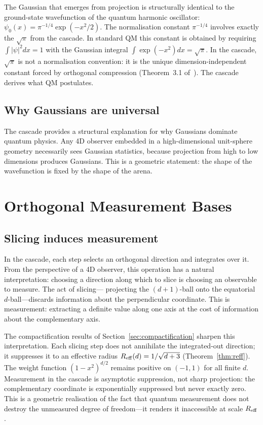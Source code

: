 \documentclass[12pt,a4paper]{article}
\begin{document}
The Gaussian that emerges from projection is structurally identical to the ground-state
wavefunction of the quantum harmonic oscillator:
$\psi_0(x)=\pi^{-1/4}\exp(-x^2/2)$. The normalisation constant $\pi^{-1/4}$ involves
exactly the $\sqrt{\pi}$ from the cascade. In standard QM this constant is obtained by
requiring $\int|\psi|^2dx=1$ with the Gaussian integral $\int\exp(-x^2)dx=\sqrt{\pi}$.
In the cascade, $\sqrt{\pi}$ is not a normalisation convention: it is the unique
dimension-independent constant forced by orthogonal compression (Theorem~3.1
of~\cite{paperI}). The cascade derives what QM postulates.

\subsection{Why Gaussians are universal}

The cascade provides a structural explanation for why Gaussians dominate quantum physics.
Any 4D observer embedded in a high-dimensional unit-sphere geometry necessarily sees
Gaussian statistics, because projection from high to low dimensions produces Gaussians.
This is a geometric statement: the shape of the wavefunction is fixed by the shape of
the arena.

\section{Orthogonal Measurement Bases}

\subsection{Slicing induces measurement}

In the cascade, each step selects an orthogonal direction and integrates over it. From the
perspective of a 4D observer, this operation has a natural interpretation: choosing a
direction along which to slice is choosing an observable to measure. The act of slicing---
projecting the $(d+1)$-ball onto the equatorial $d$-ball---discards information about the
perpendicular coordinate. This is measurement: extracting a definite value along one axis
at the cost of information about the complementary axis.

The compactification results of Section~\ref{sec:compactification} sharpen this
interpretation. Each slicing step does not annihilate the integrated-out direction; it
suppresses it to an effective radius $R_{\rm eff}(d)=1/\sqrt{d+3}$
(Theorem~\ref{thm:reff}). The weight function $(1-x^2)^{d/2}$ remains positive on $(-1,1)$
for all finite $d$. Measurement in the cascade is asymptotic suppression, not sharp
projection: the complementary coordinate is exponentially suppressed but never exactly zero.
This is a geometric realisation of the fact that quantum measurement does not destroy the
unmeasured degree of freedom---it renders it inaccessible at scale $R_{\rm eff}$.
\end{document}
